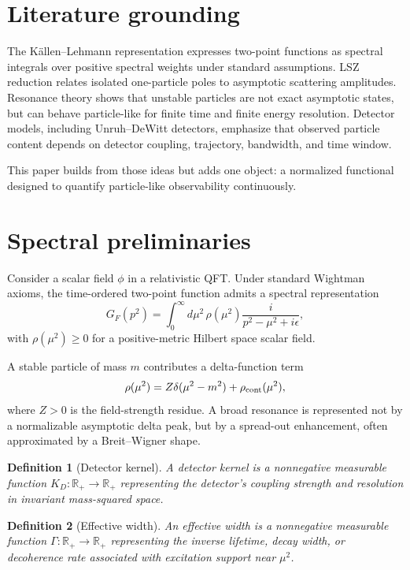 \documentclass[11pt]{article}
\newtheorem{definition}{Definition}
\theoremstyle{remark}
\begin{document}
\section{Literature grounding}

The K\"allen--Lehmann representation expresses two-point functions as spectral integrals over positive spectral weights under standard assumptions. LSZ reduction relates isolated one-particle poles to asymptotic scattering amplitudes. Resonance theory shows that unstable particles are not exact asymptotic states, but can behave particle-like for finite time and finite energy resolution. Detector models, including Unruh--DeWitt detectors, emphasize that observed particle content depends on detector coupling, trajectory, bandwidth, and time window.

This paper builds from those ideas but adds one object: a normalized functional designed to quantify particle-like observability continuously.

\section{Spectral preliminaries}

Consider a scalar field $\phi$ in a relativistic QFT. Under standard Wightman axioms, the time-ordered two-point function admits a spectral representation
\begin{equation}
G_F(p^2)=\int_0^\infty d\mu^2\,\rho(\mu^2)\frac{i}{p^2-\mu^2+i\epsilon},
\end{equation}
with $\rho(\mu^2)\ge0$ for a positive-metric Hilbert space scalar field.

A stable particle of mass $m$ contributes a delta-function term
\begin{equation}
\rho(\mu^2)=Z\delta(\mu^2-m^2)+\rho_{\rm cont}(\mu^2),
\end{equation}
where $Z>0$ is the field-strength residue. A broad resonance is represented not by a normalizable asymptotic delta peak, but by a spread-out enhancement, often approximated by a Breit--Wigner shape.

\begin{definition}[Detector kernel]
A detector kernel is a nonnegative measurable function $K_D:\mathbb R_+\to\mathbb R_+$ representing the detector's coupling strength and resolution in invariant mass-squared space.
\end{definition}

\begin{definition}[Effective width]
An effective width is a nonnegative measurable function $\Gamma:\mathbb R_+\to\mathbb R_+$ representing the inverse lifetime, decay width, or decoherence rate associated with excitation support near $\mu^2$.
\end{definition}
\end{document}
